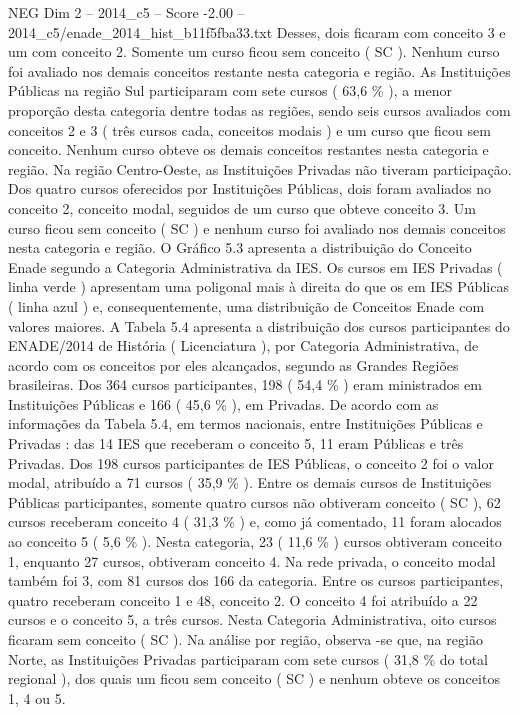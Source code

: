 \begin{textsample}{NEG Dim 2 – 2014\_c5 – Score -2.00 – 2014\_c5/enade\_2014\_hist\_b11f5fba33.txt}
Desses, dois ficaram com conceito 3 e um com conceito 2.
Somente um curso ficou sem conceito ( SC ).
Nenhum curso foi avaliado nos demais conceitos restante nesta categoria e região.
As Instituições Públicas na região Sul participaram com sete cursos ( 63,6 \% ), a menor proporção desta categoria dentre todas as regiões, sendo seis cursos avaliados com conceitos 2 e 3 ( três cursos cada, conceitos modais ) e um curso que ficou sem conceito.
Nenhum curso obteve os demais conceitos restantes nesta categoria e região.
Na região Centro-Oeste, as Instituições Privadas não tiveram participação.
Dos quatro cursos oferecidos por Instituições Públicas, dois foram avaliados no conceito 2, conceito modal, seguidos de um curso que obteve conceito 3.
Um curso ficou sem conceito ( SC ) e nenhum curso foi avaliado nos demais conceitos nesta categoria e região.
O Gráfico 5.3 apresenta a distribuição do Conceito Enade segundo a Categoria Administrativa da IES.
Os cursos em IES Privadas ( linha verde ) apresentam uma poligonal mais à direita do que os em IES Públicas ( linha azul ) e, consequentemente, uma distribuição de Conceitos Enade com valores maiores.
A Tabela 5.4 apresenta a distribuição dos cursos participantes do ENADE/2014 de História ( Licenciatura ), por Categoria Administrativa, de acordo com os conceitos por eles alcançados, segundo as Grandes Regiões brasileiras.
Dos 364 cursos participantes, 198 ( 54,4 \% ) eram ministrados em Instituições Públicas e 166 ( 45,6 \% ), em Privadas.
De acordo com as informações da Tabela 5.4, em termos nacionais, entre Instituições Públicas e Privadas : das 14 IES que receberam o conceito 5, 11 eram Públicas e três Privadas.
Dos 198 cursos participantes de IES Públicas, o conceito 2 foi o valor modal, atribuído a 71 cursos ( 35,9 \% ).
Entre os demais cursos de Instituições Públicas participantes, somente quatro cursos não obtiveram conceito ( SC ), 62 cursos receberam conceito 4 ( 31,3 \% ) e, como já comentado, 11 foram alocados ao conceito 5 ( 5,6 \% ).
Nesta categoria, 23 ( 11,6 \% ) cursos obtiveram conceito 1, enquanto 27 cursos, obtiveram conceito 4.
Na rede privada, o conceito modal também foi 3, com 81 cursos dos 166 da categoria.
Entre os cursos participantes, quatro receberam conceito 1 e 48, conceito 2.
O conceito 4 foi atribuído a 22 cursos e o conceito 5, a três cursos.
Nesta Categoria Administrativa, oito cursos ficaram sem conceito ( SC ).
Na análise por região, observa -se que, na região Norte, as Instituições Privadas participaram com sete cursos ( 31,8 \% do total regional ), dos quais um ficou sem conceito ( SC ) e nenhum obteve os conceitos 1, 4 ou 5.

\end{textsample}
